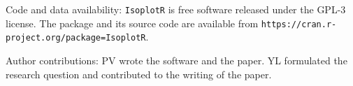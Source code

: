 \documentclass[]{article}
\begin{document}





Code and data availability: {\texttt{IsoplotR} is free software released
  under the GPL-3 license. The package and its source code are
  available from \texttt{https://cran.r-project.org/package=IsoplotR}.}\medskip










Author contributions: {PV wrote the software and the paper. YL formulated the research question and contributed to the writing of the paper.} \medskip
\end{document}
